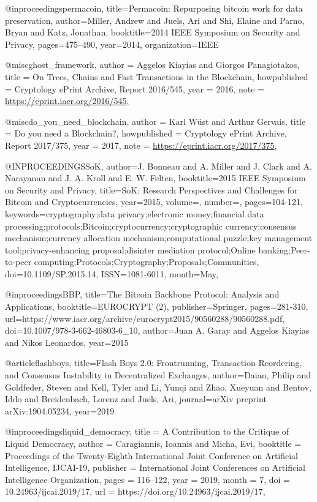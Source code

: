 @inproceedings{permacoin,
  title={Permacoin: Repurposing bitcoin work for data preservation},
  author={Miller, Andrew and Juels, Ari and Shi, Elaine and Parno, Bryan and Katz, Jonathan},
  booktitle={2014 IEEE Symposium on Security and Privacy},
  pages={475--490},
  year={2014},
  organization={IEEE}
}

@misc{ghost_framework,
    author = {Aggelos Kiayias and Giorgos Panagiotakos},
    title = {On Trees, Chains and Fast Transactions in the Blockchain},
    howpublished = {Cryptology ePrint Archive, Report 2016/545},
    year = {2016},
    note = {\url{https://eprint.iacr.org/2016/545}},
}

@misc{do_you_need_blockchain,
    author = {Karl Wüst and Arthur Gervais},
    title = {Do you need a Blockchain?},
    howpublished = {Cryptology ePrint Archive, Report 2017/375},
    year = {2017},
    note = {\url{https://eprint.iacr.org/2017/375}},
}

@INPROCEEDINGS{SoK, 
author={J. {Bonneau} and A. {Miller} and J. {Clark} and A. {Narayanan} and J. A. {Kroll} and E. W. {Felten}}, 
booktitle={2015 IEEE Symposium on Security and Privacy}, 
title={SoK: Research Perspectives and Challenges for Bitcoin and Cryptocurrencies}, 
year={2015}, 
volume={}, 
number={}, 
pages={104-121}, 
keywords={cryptography;data privacy;electronic money;financial data processing;protocols;Bitcoin;cryptocurrency;cryptographic currency;consensus mechanism;currency allocation mechanism;computational puzzle;key management tool;privacy-enhancing proposal;disinter mediation protocol;Online banking;Peer-to-peer computing;Protocols;Cryptography;Proposals;Communities}, 
doi={10.1109/SP.2015.14}, 
ISSN={1081-6011}, 
month={May},}

@inproceedings{BBP,
  title={The Bitcoin Backbone Protocol: Analysis and Applications},
  booktitle={EUROCRYPT (2)},
  publisher={Springer},
  pages={281-310},
  url={https://www.iacr.org/archive/eurocrypt2015/90560288/90560288.pdf},
  doi={10.1007/978-3-662-46803-6_10},
  author={Juan A. Garay and Aggelos Kiayias and Nikos Leonardos},
  year=2015
}

@article{flashboys,
  title={Flash Boys 2.0: Frontrunning, Transaction Reordering, and Consensus Instability in Decentralized Exchanges},
  author={Daian, Philip and Goldfeder, Steven and Kell, Tyler and Li, Yunqi and Zhao, Xueyuan and Bentov, Iddo and Breidenbach, Lorenz and Juels, Ari},
  journal={arXiv preprint arXiv:1904.05234},
  year={2019}
}

@inproceedings{liquid_democracy,
  title     = {A Contribution to the Critique of Liquid Democracy},
  author    = {Caragiannis, Ioannis and Micha, Evi},
  booktitle = {Proceedings of the Twenty-Eighth International Joint Conference on
               Artificial Intelligence, {IJCAI-19}},
  publisher = {International Joint Conferences on Artificial Intelligence Organization},             
  pages     = {116--122},
  year      = {2019},
  month     = {7},
  doi       = {10.24963/ijcai.2019/17},
  url       = {https://doi.org/10.24963/ijcai.2019/17},
}

